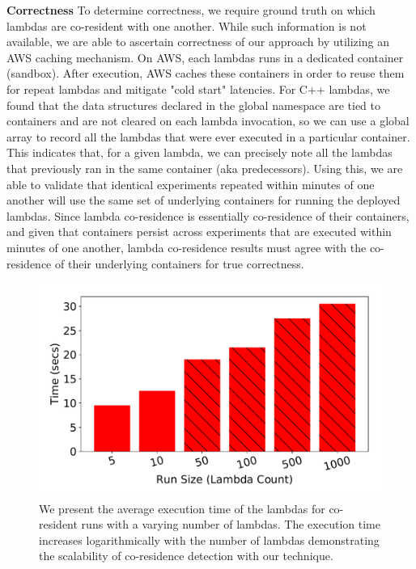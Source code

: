 \textbf{Correctness} 
To determine correctness, we require ground truth on which lambdas are
co-resident with one another. While such information is not available, we are
able to ascertain correctness of our approach by utilizing an AWS caching
mechanism. On AWS, each lambdas runs in a dedicated container (sandbox).  After
execution, AWS caches these containers in order to reuse
them~\cite{awscontainerreuse} for repeat lambdas and mitigate "cold start"
latencies. For C++ lambdas, we found that the data structures declared in the
global namespace are tied to containers and are not cleared on each lambda
invocation, so we can use a global array to record all the lambdas that were
ever executed in a particular container. This indicates that, for a given
lambda, we can precisely note all the lambdas that previously ran in the same
container (aka predecessors).  Using this, we are able to validate that
identical experiments repeated within minutes of one another will use the same
set of underlying containers for running the deployed lambdas. Since lambda
co-residence is essentially co-residence of their containers, and given that
containers persist across experiments that are executed within minutes of one
another, lambda co-residence results must agree with the co-residence of their
underlying containers for true correctness.


\begin{figure}[!t]
  \includegraphics[width=.99\linewidth]{fig/runtimes.pdf}
  \caption{We present the average execution time of the lambdas for co-resident
  runs with a varying number of lambdas. The execution time increases
  logarithmically with the number of lambdas demonstrating the scalability of
  co-residence detection with our technique.
\label{fig:runtimes}}
\end{figure}


